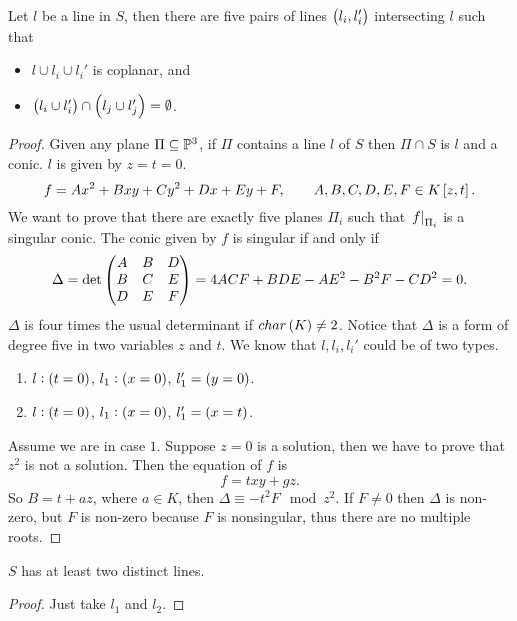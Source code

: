 \pagebreak


\begin{proposition}
Let $ l $ be a line in $ S $, then there are five pairs of lines $ \br{l_i, l_i'} $ intersecting $ l $ such that
\begin{itemize}
\item $ l \cup l_i \cup l_i' $ is coplanar, and
\item $ \br{l_i \cup l_i'} \cap \br{l_j \cup l_j'} = \emptyset $.
\end{itemize}
\end{proposition}

\begin{proof}
Given any plane $ \Pi \subseteq \P^3 $, if $ \Pi $ contains a line $ l $ of $ S $ then $ \Pi \cap S $ is $ l $ and a conic. $ l $ is given by $ z = t = 0 $.
$$ f = Ax^2 + Bxy + Cy^2 + Dx + Ey + F, \qquad A, B, C, D, E, F \in K\sbr{z, t}. $$
We want to prove that there are exactly five planes $ \Pi_i $ such that $ \eval{f}_{\Pi_i} $ is a singular conic. The conic given by $ f $ is singular if and only if
$$ \Delta = \det\threebythree{A}{B}{D}{B}{C}{E}{D}{E}{F} = 4ACF + BDE - AE^2 - B^2F - CD^2 = 0. $$
$ \Delta $ is four times the usual determinant if $ char\br{K} \ne 2 $. Notice that $ \Delta $ is a form of degree five in two variables $ z $ and $ t $. We know that $ l, l_i, l_i' $ could be of two types.
\begin{enumerate}
\item $ l : \br{t = 0} $, $ l_1 : \br{x = 0} $, $ l_1' = \br{y = 0} $.
\item $ l : \br{t = 0} $, $ l_1 : \br{x = 0} $, $ l_1' = \br{x = t} $.
\end{enumerate}
Assume we are in case $ 1 $. Suppose $ z = 0 $ is a solution, then we have to prove that $ z^2 $ is not a solution. Then the equation of $ f $ is
$$ f = txy + gz. $$
So $ B = t + az $, where $ a \in K $, then $ \Delta \equiv -t^2F \mod z^2 $. If $ F \ne 0 $ then $ \Delta $ is non-zero, but $ F $ is non-zero because $ F $ is nonsingular, thus there are no multiple roots.
\end{proof}

\begin{corollary}
$ S $ has at least two distinct lines.
\end{corollary}

\begin{proof}
Just take $ l_1 $ and $ l_2 $.
\end{proof}

